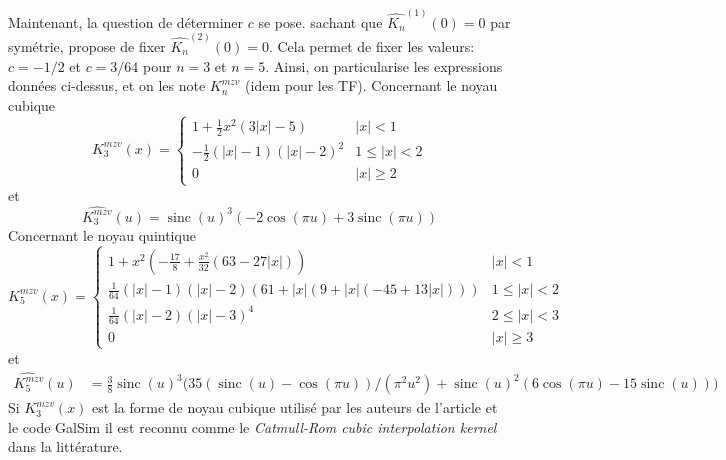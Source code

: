 \documentclass[11pt,twoside]{article}
\DeclareMathOperator{\sinc}{sinc}
\begin{document}
Maintenant, la question de déterminer $c$ se pose. \cite{Meijering1999} sachant que  $\hat{K_n}^{(1)}(0) = 0$ par symétrie, propose de fixer $\hat{K_n}^{(2)}(0) = 0$. Cela permet de fixer les valeurs: $c=-1/2$ et $c=3/64$ pour $n=3$ et $n=5$. Ainsi, on particularise les expressions données ci-dessus, et on les note $K^{mzv}_n$ (idem pour les TF). Concernant le noyau cubique
\begin{equation}
K^{mzv}_3(x) = \begin{cases}
1 +\frac{1}{2}x^2(3|x|-5) & |x|< 1 \\
-\frac{1}{2}(|x|-1)(|x|-2)^2& 1\leq |x|<2 \\
0 & |x| \geq 2
\end{cases}
\end{equation}
et
\begin{equation}
\widehat{K^{mzv}_3}(u) = \sinc(u)^3 (-2 \cos(\pi u) + 3 \sinc(\pi u))
\end{equation}
 Concernant le noyau quintique
\begin{equation}
K^{mzv}_5(x) = \begin{cases}
1 + x^2\left(-\frac{17}{8}+\frac{x^2}{32}\left(63- 27|x|\right) \right) & |x|< 1 \\
\frac{1}{64}(|x|-1)(|x|-2)(61+|x|(9+|x|(-45+13|x|)))& 1\leq |x|<2 \\
\frac{1}{64}(|x|-2)(|x|-3)^4 & 2\leq |x|<3 \\
0 & |x| \geq 3
\end{cases}
\end{equation}
et
\begin{align}
\widehat{K^{mzv}_5}(u) &=\frac{3}{8} \sinc(u)^3 \Big(35 (\sinc(u) - 
       \cos(\pi u) )/ (\pi^2 u^2) + 
   \sinc(u)^2 (6 \cos(\pi u) - 15 \sinc(u))\Big)
\end{align}
Si $K^{mzv}_3(x)$ est la forme  de noyau cubique utilisé par les auteurs de l'article \cite{2014PASP..126..287B} et le code \textsf{GalSim} il est reconnu comme le \textit{Catmull-Rom cubic interpolation kernel} dans la littérature. 
\end{document}
